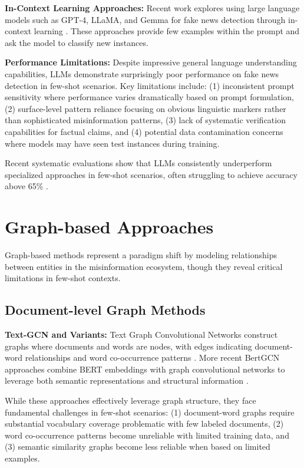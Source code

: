 \textbf{In-Context Learning Approaches:} Recent work explores using large language models such as GPT-4, LLaMA, and Gemma for fake news detection through in-context learning \cite{touvron2023llama, team2024gemma}. These approaches provide few examples within the prompt and ask the model to classify new instances.

\textbf{Performance Limitations:} Despite impressive general language understanding capabilities, LLMs demonstrate surprisingly poor performance on fake news detection in few-shot scenarios. Key limitations include: (1) inconsistent prompt sensitivity where performance varies dramatically based on prompt formulation, (2) surface-level pattern reliance focusing on obvious linguistic markers rather than sophisticated misinformation patterns, (3) lack of systematic verification capabilities for factual claims, and (4) potential data contamination concerns where models may have seen test instances during training.

Recent systematic evaluations show that LLMs consistently underperform specialized approaches in few-shot scenarios, often struggling to achieve accuracy above 65\% \cite{huang2023chatgpt, zhang2023can}.

\section{Graph-based Approaches}

Graph-based methods represent a paradigm shift by modeling relationships between entities in the misinformation ecosystem, though they reveal critical limitations in few-shot contexts.

\subsection{Document-level Graph Methods}

\textbf{Text-GCN and Variants:} Text Graph Convolutional Networks construct graphs where documents and words are nodes, with edges indicating document-word relationships and word co-occurrence patterns \cite{yao2019graph}. More recent BertGCN approaches combine BERT embeddings with graph convolutional networks to leverage both semantic representations and structural information \cite{lin2021bertgcn}.

While these approaches effectively leverage graph structure, they face fundamental challenges in few-shot scenarios: (1) document-word graphs require substantial vocabulary coverage problematic with few labeled documents, (2) word co-occurrence patterns become unreliable with limited training data, and (3) semantic similarity graphs become less reliable when based on limited examples.


